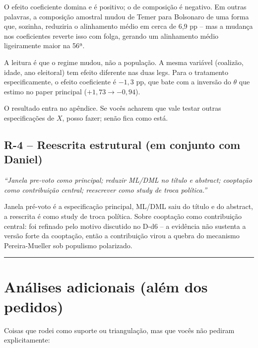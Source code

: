 \documentclass[11pt,a4paper]{article}
\newcommand{\pedido}[1]{\par\medskip\noindent\textit{\textcolor{quotegray}{#1}}\par\smallskip}
\begin{document}
O efeito coeficiente domina e é positivo; o de composição é negativo. Em outras palavras, a composição amostral mudou de Temer para Bolsonaro de uma forma que, sozinha, reduziria o alinhamento médio em cerca de 6,9 pp -- mas a mudança nos coeficientes reverte isso com folga, gerando um alinhamento médio ligeiramente maior na 56ª.

A leitura é que o regime mudou, não a população. A mesma variável (coalizão, idade, ano eleitoral) tem efeito diferente nas duas legs. Para o tratamento especificamente, o efeito coeficiente é $-1{,}3$ pp, que bate com a inversão do $\theta$ que estimo no paper principal ($+1{,}73 \to -0{,}94$).

O resultado entra no apêndice. Se vocês acharem que vale testar outras especificações de $X$, posso fazer; senão fica como está.

\subsection*{R-4 -- Reescrita estrutural (em conjunto com Daniel)}

\pedido{``Janela pre-voto como principal; reduzir ML/DML no título e abstract; cooptação como contribuição central; reescrever como study de troca política.''}

Janela pré-voto é a especificação principal, ML/DML saiu do título e do abstract, a reescrita é como study de troca política. Sobre cooptação como contribuição central: foi refinado pelo motivo discutido no D-d6 -- a evidência não sustenta a versão forte da cooptação, então a contribuição virou a quebra do mecanismo Pereira-Mueller sob populismo polarizado.

\bigskip\hrule\bigskip

\section{Análises adicionais (além dos pedidos)}

Coisas que rodei como suporte ou triangulação, mas que vocês não pediram explicitamente:
\end{document}
